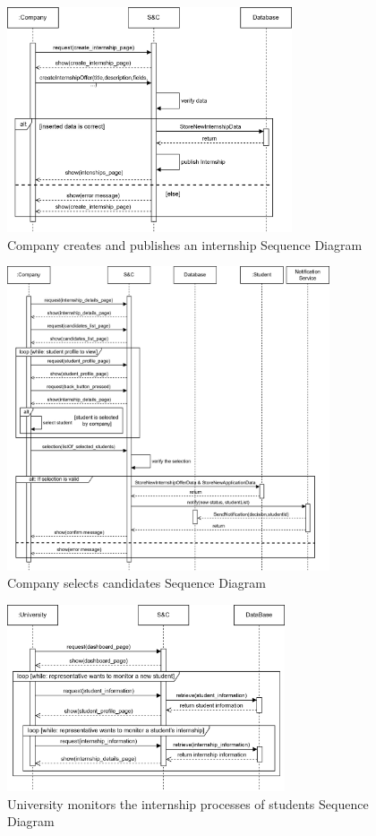 \begin{figure}[H]
    \centering
    \includegraphics[width=0.75\textwidth]{Images/Sequence_Diagrams/createInt_SD.png}
    \caption{Company creates and publishes an internship Sequence Diagram}
\end{figure}
\begin{figure}[H]
    \centering
    \includegraphics[width=0.85\textwidth]{Images/Sequence_Diagrams/select_SD.png}
    \caption{Company selects candidates Sequence Diagram}
\end{figure}
\begin{figure}[H]
    \centering
    \includegraphics[width=0.73\textwidth]{Images/Sequence_Diagrams/monitor_SD.png}
    \caption{University monitors the internship processes of students Sequence Diagram}
\end{figure}


